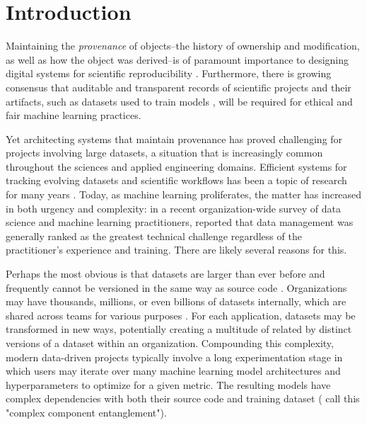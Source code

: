 \documentclass[10pt,sigconf, authordraft]{acmart}
\begin{document}


\maketitle

\section{Introduction}
Maintaining the \textit{provenance} of objects--the history of ownership and modification, as well as how the object was derived--is of paramount importance to designing digital systems for scientific reproducibility \cite{Muniswamy-Reddy2006Provenance-awareSystems,Davidson2008ProvenanceOpportunities,NationalAcademiesofSciences2019ReproducibilityScience}. Furthermore, there is growing consensus that auditable and transparent records of scientific projects and their artifacts, such as datasets used to train models \cite{GebruDatasheetsDatasets}, will be required for ethical and fair machine learning practices. 

Yet architecting systems that maintain provenance has proved challenging for projects involving large datasets, a situation that is increasingly common throughout the sciences and applied engineering domains. Efficient systems for tracking evolving datasets and scientific workflows has been a topic of research for many years \cite{Davidson2007ProvenanceSystems.,Azsoyoglu1995TemporalSurvey,Salzberg1999ComparisonData,Bhattacherjee2015PrinciplesTradeoff}. Today, as machine learning proliferates, the matter has increased in both urgency and complexity: in a recent organization-wide survey of data science and machine learning practitioners, \citet{Amershi2019SoftwareStudy} reported that data management was generally ranked as the greatest technical challenge regardless of the practitioner's experience and training. There are likely several reasons for this. 

Perhaps the most obvious is that datasets are larger than ever before and frequently cannot be versioned in the same way as source code \cite{Bhattacherjee2015PrinciplesTradeoff}. Organizations may have thousands, millions, or even billions of datasets internally, which are shared across teams for various purposes \cite{Halevy2016Goods:Datasets}. For each application, datasets may be transformed in new ways, potentially creating a multitude of related by distinct versions of a dataset within an organization.  Compounding this complexity, modern data-driven projects typically involve a long experimentation stage in which users may iterate over many machine learning model architectures and hyperparameters to optimize for a given metric. The resulting models have complex dependencies with both their source code and training dataset (\citet{Amershi2019SoftwareStudy} call this "complex component entanglement"). 
\end{document}
